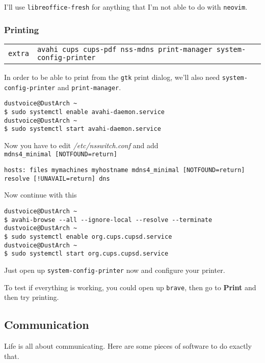 \documentclass[9pt]{report}
\newenvironment{packagetable}
{\begin{longtabu}to \textwidth [b]{X[1,r]|X[1,l]}}
{\end{longtabu}}
\let\ab\allowbreak
\begin{document}
I’ll use \texttt{libreoffice-fresh} for anything that I’m not able to do with \texttt{neovim}.



\newpage

\hypertarget{x-printing}{\subsubsection{Printing}}
\begin{packagetable}
    \texttt{extra} & \texttt{avahi cups cups-pdf nss-mdns print-manager system-config-printer} \\ 
\end{packagetable}

In order to be able to print from the \texttt{gtk} print dialog, we’ll also need \texttt{system-\ab{}config-\ab{}printer} and \texttt{print-manager}.


\begin{verbatim}
dustvoice@DustArch ~
$ sudo systemctl enable avahi-daemon.service
dustvoice@DustArch ~
$ sudo systemctl start avahi-daemon.service
\end{verbatim}

Now you have to edit \textit{/etc/nsswitch.conf} and add\\ \texttt{mdns4\_minimal [NOTFOUND=return]}


\begin{verbatim}
hosts: files mymachines myhostname mdns4_minimal [NOTFOUND=return] resolve [!UNAVAIL=return] dns
\end{verbatim}

Now continue with this


\begin{verbatim}
dustvoice@DustArch ~
$ avahi-browse --all --ignore-local --resolve --terminate
dustvoice@DustArch ~
$ sudo systemctl enable org.cups.cupsd.service
dustvoice@DustArch ~
$ sudo systemctl start org.cups.cupsd.service
\end{verbatim}

Just open up \texttt{system-config-printer} now and configure your printer.


To test if everything is working, you could open up \texttt{brave}, then go to \textbf{Print} and then try printing.



\newpage

\hypertarget{x-communication}{\subsection{Communication}}
Life is all about communicating.
Here are some pieces of software to do exactly that.
\end{document}
